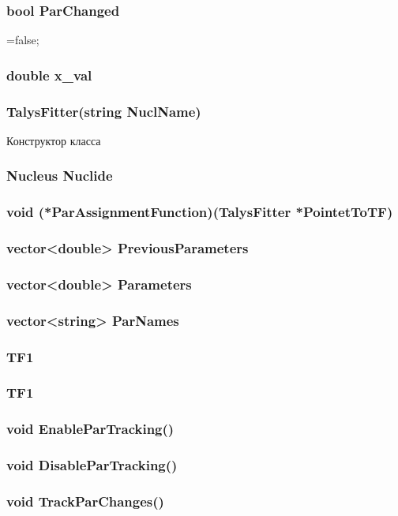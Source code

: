 \documentclass[a4paper,12pt]{extarticle}
\begin{document}
\subsubsection{bool ParChanged}
=false;
\subsubsection{double x_val}

\subsubsection{TalysFitter(string NuclName)}
Конструктор класса
\subsubsection{Nucleus Nuclide}

\subsubsection{void (*ParAssignmentFunction)(TalysFitter *PointetToTF)}
\subsubsection{vector<double> PreviousParameters}
\subsubsection{vector<double> Parameters}
\subsubsection{vector<string> ParNames}
\subsubsection{TF1}
\subsubsection{TF1}
\subsubsection{void EnableParTracking()}
\subsubsection{void DisableParTracking()}
\subsubsection{void TrackParChanges()}
\end{document}
